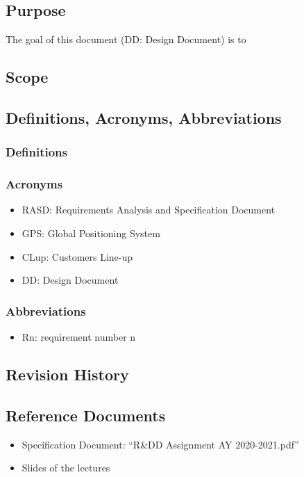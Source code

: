 \renewcommand{\thesubsection}{\Alph{subsection}}
     	\subsection{Purpose}
	The goal of this document (DD: Design Document) is to

         \subsection{Scope}
         
         \subsection{Definitions, Acronyms, Abbreviations}
         	\subsubsection{Definitions}
		
		\subsubsection{Acronyms}
		\begin{itemize}
			\item \textcolor{BrickRed}{RASD}: Requirements Analysis and Specification Document 
			\item \textcolor{BrickRed}{GPS}: Global Positioning System
			\item \textcolor{BrickRed}{CLup}: Customers Line-up
			\item \textcolor{BrickRed}{DD}: Design Document 
		\end{itemize}
		
		\subsubsection{Abbreviations}
		\begin{itemize}
			\item \textcolor{BrickRed}{Rn}: requirement number n
		\end{itemize}
		
	\subsection{Revision History}
	
	\subsection{Reference Documents}
	\begin{itemize}
			\item \textcolor{BrickRed}{Specification Document}: “R\&DD Assignment AY 2020-2021.pdf”
			\item \textcolor{BrickRed}{Slides of the lectures}
	\end{itemize}
		
